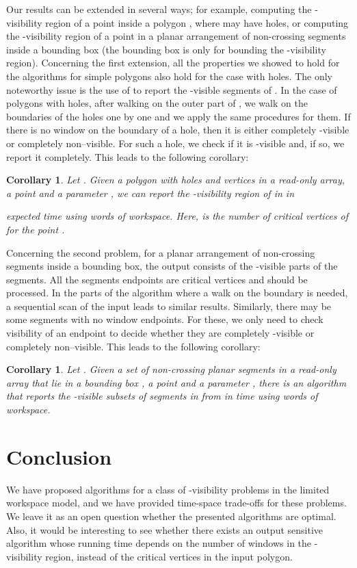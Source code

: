 \documentclass[11pt, a4paper]{article}
\newtheorem{cor}[theorem1]{Corollary}{\bfseries}{\itshape}
\begin{document}
Our results can be extended in several ways; for example, computing 
the -visibility region of a point  inside a polygon , where 
 may have holes, or computing the -visibility region of a 
point  in a planar arrangement of  non-crossing segments 
inside a bounding box (the bounding box is only for bounding the 
-visibility region). Concerning the first extension, all the properties
we showed to hold for the algorithms for simple polygons
also hold for the case with holes. The only noteworthy 
issue is the use of  to 
report the -visible segments of . In the case of 
polygons with holes, after walking on the outer part of 
, we walk on the boundaries of the holes one by one and 
we apply the same procedures for them. If there is no window on the 
boundary of a hole, then it is either completely -visible or 
completely non--visible. For such a hole, we check if it is 
-visible and, if so, we report it completely. 
This leads to the following corollary:

\begin{cor}\label{cor:polygon with holes}
Let .
Given a polygon  with  holes and  vertices in a 
read-only array, a point  and a parameter 
, we can report the -visibility region of  in  in  
 
expected time using  words of workspace. Here,  is the 
number of critical vertices of  for the point .
\end{cor}

Concerning the second problem, for a planar arrangement of  non-crossing 
segments inside a bounding box, the output consists of the 
-visible parts of the segments. All the segments endpoints 
are critical vertices and should be processed. In the parts of the 
algorithm where a walk on the boundary is needed, a sequential scan 
of the input leads to similar results. Similarly, there may be some 
segments with no window endpoints. For these, we only need to check 
visibility of an endpoint to decide whether they are completely 
-visible or completely non--visible. 
This leads to the following corollary:

\begin{cor}\label{cor:segments}
Let .
Given a set  of  non-crossing planar segments in a read-only 
array that lie in a bounding box , a point  and a 
parameter , there is an algorithm that 
reports the -visible subsets of segments in  from  in
 time using  words of workspace.
\end{cor}

\section{Conclusion}
We have proposed algorithms for a class of -visibility problems 
in the limited workspace model, and we have provided time-space 
trade-offs for these problems. We leave it as an open question 
whether the presented algorithms are optimal. Also, it 
would be interesting to see whether there exists an output sensitive 
algorithm whose running time depends on the number of windows in 
the -visibility region, instead of the critical vertices in the input polygon.
\end{document}
